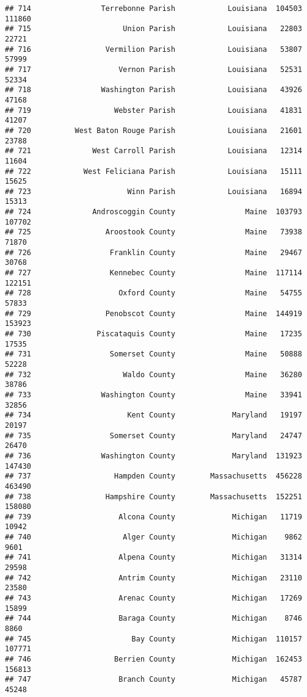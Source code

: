 \documentclass[
]{article}
\begin{document}
\begin{verbatim}
## 714                Terrebonne Parish            Louisiana  104503  111860
## 715                     Union Parish            Louisiana   22803   22721
## 716                 Vermilion Parish            Louisiana   53807   57999
## 717                    Vernon Parish            Louisiana   52531   52334
## 718                Washington Parish            Louisiana   43926   47168
## 719                   Webster Parish            Louisiana   41831   41207
## 720          West Baton Rouge Parish            Louisiana   21601   23788
## 721              West Carroll Parish            Louisiana   12314   11604
## 722            West Feliciana Parish            Louisiana   15111   15625
## 723                      Winn Parish            Louisiana   16894   15313
## 724              Androscoggin County                Maine  103793  107702
## 725                 Aroostook County                Maine   73938   71870
## 726                  Franklin County                Maine   29467   30768
## 727                  Kennebec County                Maine  117114  122151
## 728                    Oxford County                Maine   54755   57833
## 729                 Penobscot County                Maine  144919  153923
## 730               Piscataquis County                Maine   17235   17535
## 731                  Somerset County                Maine   50888   52228
## 732                     Waldo County                Maine   36280   38786
## 733                Washington County                Maine   33941   32856
## 734                      Kent County             Maryland   19197   20197
## 735                  Somerset County             Maryland   24747   26470
## 736                Washington County             Maryland  131923  147430
## 737                   Hampden County        Massachusetts  456228  463490
## 738                 Hampshire County        Massachusetts  152251  158080
## 739                    Alcona County             Michigan   11719   10942
## 740                     Alger County             Michigan    9862    9601
## 741                    Alpena County             Michigan   31314   29598
## 742                    Antrim County             Michigan   23110   23580
## 743                    Arenac County             Michigan   17269   15899
## 744                    Baraga County             Michigan    8746    8860
## 745                       Bay County             Michigan  110157  107771
## 746                   Berrien County             Michigan  162453  156813
## 747                    Branch County             Michigan   45787   45248

\end{verbatim}
\end{document}
